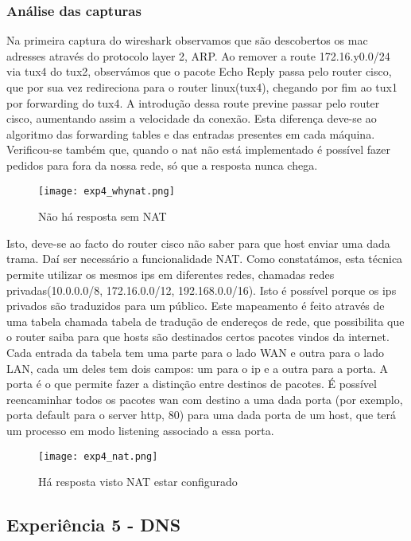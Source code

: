 \documentclass[a4paper]{article}
\begin{document}
\subsubsection{Análise das capturas}
Na primeira captura do wireshark observamos que são descobertos os mac adresses
através do protocolo layer 2, ARP. Ao remover a route 172.16.y0.0/24 via tux4
do tux2, observámos que o pacote Echo Reply passa pelo router cisco, que por
sua vez redireciona para o router linux(tux4), chegando por fim ao tux1 por
forwarding do tux4. A introdução dessa route previne passar pelo router cisco,
aumentando assim a velocidade da conexão. Esta diferença deve-se ao algoritmo
das forwarding tables e das entradas presentes em cada máquina. Verificou-se
também que, quando o nat não está implementado é possível fazer pedidos para
fora da nossa rede, só que a resposta nunca chega.

\begin{figure}[h]
    \centering
    \texttt{[image: exp4\_whynat.png]}
    \caption{Não há resposta sem NAT}
\end{figure}

Isto, deve-se ao facto do router cisco não saber para que host enviar uma dada
trama. Daí ser necessário a funcionalidade NAT. Como constatámos, esta técnica
permite utilizar os mesmos ips em diferentes redes, chamadas redes
privadas(10.0.0.0/8, 172.16.0.0/12, 192.168.0.0/16). Isto é possível porque os
ips privados são traduzidos para um público. Este mapeamento é feito através de
uma tabela chamada tabela de tradução de endereços de rede, que possibilita que
o router saiba para que hosts são destinados certos pacotes vindos da internet.
Cada entrada da tabela tem uma parte para o lado WAN e outra para o lado LAN,
cada um deles tem dois campos: um para o ip e a outra para a porta. A porta é o
que permite fazer a distinção entre destinos de pacotes. É possível
reencaminhar todos os pacotes wan com destino a uma dada porta (por exemplo,
porta default para o server http, 80) para uma dada porta de um host, que terá
um processo em modo listening associado a essa porta.

\begin{figure}[h]
    \centering
    \texttt{[image: exp4\_nat.png]}
    \caption{Há resposta visto NAT estar configurado}
\end{figure}

\subsection{Experiência 5 - DNS}
\end{document}
